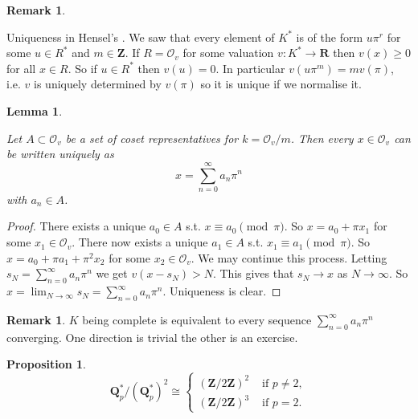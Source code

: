 \documentclass[10pt,]{book}
\newcommand{\gt}{>}
\theoremstyle{plain}
\newtheorem{lemma}[theorem]{Lemma}
\newtheorem{proposition}[theorem]{Proposition}
\theoremstyle{definition}
\newtheorem{remark}[theorem]{Remark}
\newcommand{\QQ}{\mathbf{Q}}
\newcommand{\RR}{\mathbf{R}}
\newcommand{\ZZ}{\mathbf{Z}}
\newcommand{\cO}{\mathcal{O}}
\begin{document}
\begin{remark}\label{remark-6}

            Uniqueness in Hensel's .
            We saw that every element of \(K^*\) is of the form \( u \pi^r\) for some \(u \in R^*\) and \(m \in \ZZ\).
            If \(R= \cO_v\) for some valuation \(v \colon K^* \to \RR\) then \(v(x) \ge 0\) for all \(x \in R\).
            So if \(u \in R^*\) then \(v(u) = 0\).
            In particular \(v(u\pi^m) = m v(\pi)\), i.e. \(v\) is uniquely determined by \(v(\pi)\) so it is unique if we normalise it.
          \end{remark}
\begin{lemma}\label{lemma-10}

            Let \(A \subset \cO_v\) be a set of coset representatives for \(k = \cO_v/m\).
            Then every \(x \in \cO_v\) can be written uniquely as \[x = \sum_{n=0}^\infty a_n \pi ^n\] with \(a_n \in A\).
          \end{lemma}
\begin{proof}

            There exists a unique \(a_0 \in A\) s.t. \(x \equiv a_0 \pmod{\pi}\).
            So \(x = a_0 + \pi x_1\) for some \(x_1 \in \cO_v\).
            There now exists a unique \(a_1 \in A\) s.t. \(x_1 \equiv a_1 \pmod{\pi}\).
            So \(x = a_0 + \pi a_1 + \pi^2 x_2\) for some \(x_2 \in \cO_v\).
            We may continue this process.
            Letting \(s_N = \sum_{n=0}^\infty a_n \pi ^n\) we get \(v(x - s_N) \gt N\).
            This gives that \(s_N \to x\) as \(N \to \infty\).
            So \(x = \lim_{N \to \infty} s_N = \sum_{n=0}^\infty a_n \pi ^n\).
            Uniqueness is clear.
          \end{proof}
\begin{remark}\label{remark-7}
\(K\) being complete is equivalent to every sequence \(\sum_{n=0}^\infty a_n \pi^n\) converging.
            One direction is trivial the other is an exercise.
          \end{remark}
\begin{proposition}\label{proposition-1}
\[\QQ_p^* /(\QQ_p^*)^2\cong \begin{cases} (\ZZ/2\ZZ)^2& \text{ if } p \ne 2,\\ (\ZZ/2\ZZ)^3& \text{ if } p= 2.\end{cases}\]\end{proposition}
\end{document}
